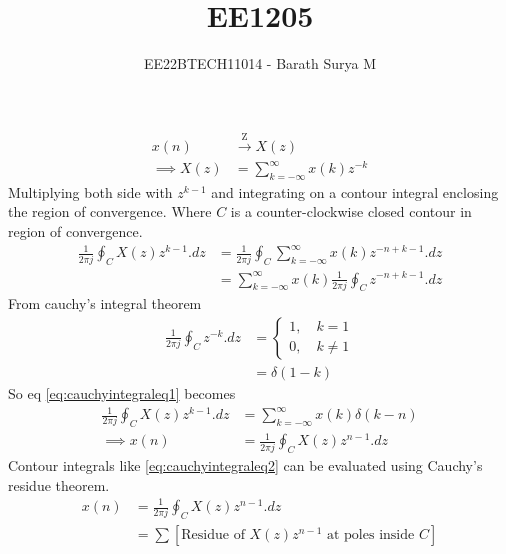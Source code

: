 \documentclass[journal,12pt,onecolumn]{IEEEtran}
\theoremstyle{remark}
\providecommand{\sbrak}[1]{\ensuremath{{}\left[#1\right]}}
\providecommand{\brak}[1]{\ensuremath{\left(#1\right)}}
\begin{document}

\vspace{3cm}

\title{EE1205}
\author{EE22BTECH11014 - Barath Surya M}
\maketitle
\begin{align}
    x\brak{n}          & \xrightarrow{\text{Z}} X\brak{z}             \\
    \implies X\brak{z} & = \sum_{k=-\infty}^{\infty} x\brak{k} z^{-k}
\end{align}
Multiplying both side with $z^{k-1}$ and integrating on a contour integral enclosing the region of convergence. Where $C$ is a counter-clockwise closed contour in region of convergence.
\begin{align}
    \frac{1}{2\pi j} \oint_C X\brak{z} z^{k-1} .dz & = \frac{1}{2\pi j} \oint_C \sum_{k=-\infty}^{\infty} x\brak{k} z^{-n+k-1} .dz                              \\
                                                   & =\sum_{k=-\infty}^{\infty} x\brak{k}  \frac{1}{2\pi j} \oint_C z^{-n+k-1} .dz \label{eq:cauchyintegraleq1}
\end{align}
From cauchy's integral theorem
\begin{align}
    \frac{1}{2\pi j} \oint_C z^{-k} .dz & = \begin{cases}
                                                1, \quad k = 1 \\
                                                0, \quad k\neq 1
                                            \end{cases}  \\
                                        & = \delta\brak{1-k}
\end{align}
So eq \eqref{eq:cauchyintegraleq1} becomes
\begin{align}
    \frac{1}{2\pi j} \oint_C X\brak{z} z^{k-1} .dz & = \sum_{k=-\infty}^{\infty} x\brak{k} \delta \brak{k-n}                        \\
    \implies x\brak{n}                             & =  \frac{1}{2\pi j} \oint_C X\brak{z} z^{n-1} .dz \label{eq:cauchyintegraleq2}
\end{align}
Contour integrals like \eqref{eq:cauchyintegraleq2} can be evaluated using Cauchy's residue theorem.
\begin{align}
    x\brak{n} & =  \frac{1}{2\pi j} \oint_C X\brak{z} z^{n-1} .dz                              \\
              & = \sum \sbrak{\text{Residue of } X\brak{z} z^{n-1} \text{ at poles inside } C}
\end{align}
\end{document}
